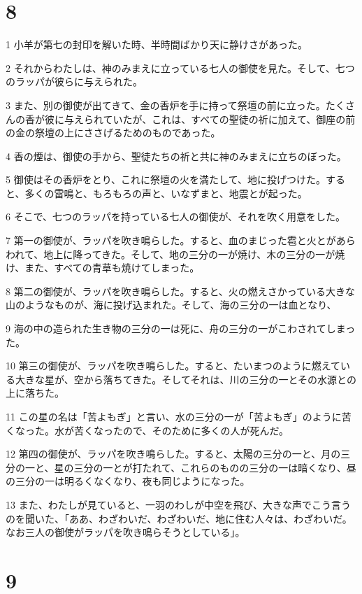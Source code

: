 \chapter{8}

\par 1 小羊が第七の封印を解いた時、半時間ばかり天に静けさがあった。
\par 2 それからわたしは、神のみまえに立っている七人の御使を見た。そして、七つのラッパが彼らに与えられた。
\par 3 また、別の御使が出てきて、金の香炉を手に持って祭壇の前に立った。たくさんの香が彼に与えられていたが、これは、すべての聖徒の祈に加えて、御座の前の金の祭壇の上にささげるためのものであった。
\par 4 香の煙は、御使の手から、聖徒たちの祈と共に神のみまえに立ちのぼった。
\par 5 御使はその香炉をとり、これに祭壇の火を満たして、地に投げつけた。すると、多くの雷鳴と、もろもろの声と、いなずまと、地震とが起った。
\par 6 そこで、七つのラッパを持っている七人の御使が、それを吹く用意をした。
\par 7 第一の御使が、ラッパを吹き鳴らした。すると、血のまじった雹と火とがあらわれて、地上に降ってきた。そして、地の三分の一が焼け、木の三分の一が焼け、また、すべての青草も焼けてしまった。
\par 8 第二の御使が、ラッパを吹き鳴らした。すると、火の燃えさかっている大きな山のようなものが、海に投げ込まれた。そして、海の三分の一は血となり、
\par 9 海の中の造られた生き物の三分の一は死に、舟の三分の一がこわされてしまった。
\par 10 第三の御使が、ラッパを吹き鳴らした。すると、たいまつのように燃えている大きな星が、空から落ちてきた。そしてそれは、川の三分の一とその水源との上に落ちた。
\par 11 この星の名は「苦よもぎ」と言い、水の三分の一が「苦よもぎ」のように苦くなった。水が苦くなったので、そのために多くの人が死んだ。
\par 12 第四の御使が、ラッパを吹き鳴らした。すると、太陽の三分の一と、月の三分の一と、星の三分の一とが打たれて、これらのものの三分の一は暗くなり、昼の三分の一は明るくなくなり、夜も同じようになった。
\par 13 また、わたしが見ていると、一羽のわしが中空を飛び、大きな声でこう言うのを聞いた、「ああ、わざわいだ、わざわいだ、地に住む人々は、わざわいだ。なお三人の御使がラッパを吹き鳴らそうとしている」。

\chapter{9}

